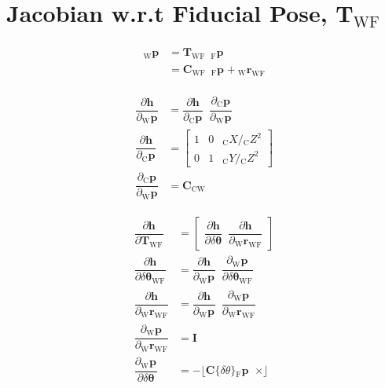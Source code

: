 \documentclass{report}
\renewcommand{\Vec}[1]{{\mathbf{#1}}}
\newcommand{\Mat}[1]{{\mathbf{#1}}}
\newcommand{\I}{{\Mat{I}}}
\newcommand{\Skew}[1]{{\lfloor #1 \enspace \times \rfloor}}
\newcommand{\tf}{\mathbf{T}}
\newcommand{\cam}{{\text{C}}}
\newcommand{\world}{{\text{W}}}
\newcommand{\fiducial}{{\text{F}}}
\newcommand{\KineNotationTransform}[3]{{{#1}_{#2#3}}}
\newcommand{\KineNotation}[3]{{{{}_{#2}} {#1}_{#2#3}}}
\newcommand{\KineNotationPart}[3]{{{{}_{#2}} {#1}_{#3}}}
\newcommand{\KineNotationBare}[2]{{{{}_{#2}} {#1}}}
\newcommand{\trans}{{\Vec{r}}}
\newcommand{\Trans}[2]{{\KineNotation{\trans}{#1}{#2}}}
\newcommand{\pos}{{\Vec{r}}}
\newcommand{\Pos}[2]{{\KineNotation{\pos}{#1}{#2}}}
\newcommand{\rot}{{\Mat{C}}}
\newcommand{\Rot}[2]{{\KineNotationTransform{\rot}{#1}{#2}}}
\newcommand{\tf}{{\Mat{T}}}
\newcommand{\Tf}[2]{{\KineNotationTransform{\tf}{#1}{#2}}}
\newcommand{\point}{\Vec{p}}
\newcommand{\Pt}[1]{{\KineNotationPart{\point}{#1}{}}}
\newcommand{\projFunc}{{\Vec{h}}}
\begin{document}
\section{Jacobian w.r.t Fiducial Pose, $\Tf{\world}{\fiducial}$}

\begin{align}
\begin{split}
  \Pt{\world}
		&= \Tf{\world}{\fiducial}
			\enspace
			\Pt{\fiducial} \\
		&= \Rot{\world}{\fiducial}
			\enspace
			\Pt{\fiducial}
			+ \Trans{\world}{\fiducial}
\end{split}
\end{align}

\begin{align}
  \dfrac{\partial{\projFunc}}{\partial{\Pt{\world}}}
		&=
			\dfrac{\partial{\projFunc}}{\partial{\Pt{\cam}}}
			\enspace
			\dfrac{\partial{\Pt{\cam}}}{\partial{\Pt{\world}}} \\
  \dfrac{\partial{\projFunc}}{\partial{\Pt{\cam}}}
		&=
			\begin{bmatrix}
				1 & 0 & \KineNotationBare{X}{\cam} / \KineNotationBare{Z}{\cam}^{2} \\
				0 & 1 & \KineNotationBare{Y}{\cam} / \KineNotationBare{Z}{\cam}^{2}
			\end{bmatrix} \\
  \dfrac{\partial{\Pt{\cam}}}{\partial{\Pt{\world}}}
		&= \Rot{\cam}{\world}
\end{align}

\begin{align}
	\dfrac{\partial{\projFunc}}{\partial{\Tf{\world}{\fiducial}}}
		&=
			\begin{bmatrix}
				\dfrac{\partial \projFunc}{\partial \delta\Vec{\theta}}
				\enspace
				\dfrac{\partial \projFunc}{\partial \Pos{\world}{\fiducial}}
			\end{bmatrix} \\
  \dfrac{\partial{\projFunc}}
				{\partial{\delta\Vec{\theta}_{\world\fiducial}}}
		&=
			\dfrac{\partial{\projFunc}}
						{\partial{\Pt{\world}}}
			\enspace
			\dfrac{\partial{\Pt{\world}}}
						{\partial{\delta\Vec{\theta}_{\world\fiducial}}} \\
  \dfrac{\partial{\projFunc}}{\partial{\Pos{\world}{\fiducial}}}
		&=
			\dfrac{\partial{\projFunc}}{\partial{\Pt{\world}}}
			\enspace
			\dfrac{\partial{\Pt{\world}}}{\partial{\Pos{\world}{\fiducial}}} \\
  \dfrac{\partial{\Pt{\world}}}{\partial{\Pos{\world}{\fiducial}}}
		&= \I \\
  \dfrac{\partial{\Pt{\world}}}{\partial{\delta\Vec{\theta}}}
		&= -\Skew{\rot\{\delta \theta\} \Pt{\fiducial}}
\end{align}




\newpage


\end{document}
